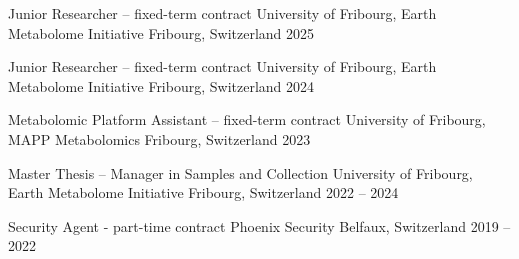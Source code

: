 

\begin{cventries}


\cventry
  {Junior Researcher – fixed-term contract} %
  {University of Fribourg, Earth Metabolome Initiative} %
  {Fribourg, Switzerland} %
  {2025} %
  {}

\cventry
  {Junior Researcher – fixed-term contract} %
  {University of Fribourg, Earth Metabolome Initiative} %
  {Fribourg, Switzerland} %
  {2024} %
  {}

\cventry
  {Metabolomic Platform Assistant – fixed-term contract} %
  {University of Fribourg, MAPP Metabolomics} %
  {Fribourg, Switzerland} %
  {2023} %
  {}

\cventry
  {Master Thesis – Manager in Samples and Collection} %
  {University of Fribourg, Earth Metabolome Initiative} %
  {Fribourg, Switzerland} %
  {2022 -- 2024} %
  {}

\cventry
  {Security Agent - part-time contract} %
  {Phoenix Security} %
  {Belfaux, Switzerland} %
  {2019 -- 2022} %
  {}

\end{cventries}

